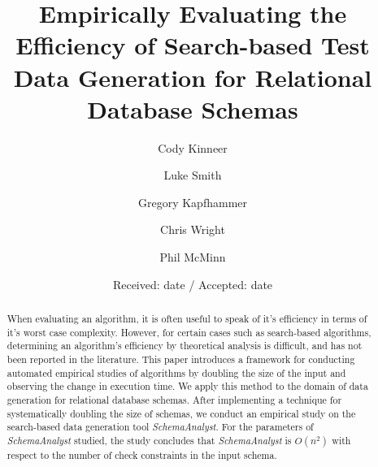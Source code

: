 \documentclass[smallextended]{svjour3}       %
\begin{document}
\title{Empirically Evaluating the Efficiency of Search-based Test Data
Generation for Relational Database Schemas}



\author{Cody Kinneer         \and
        Luke Smith \and
        Gregory Kapfhammer \and
        Chris Wright \and
        Phil McMinn
}



\date{Received: date / Accepted: date}


\maketitle

\begin{abstract}
When evaluating an algorithm, it is often useful to speak of it's
efficiency in terms of it's worst case complexity.  However, for certain
cases such as search-based algorithms, determining an algorithm's
efficiency by theoretical analysis is difficult, and has not been
reported in the literature. This paper introduces a
framework for conducting automated empirical studies of algorithms by
doubling the size of the input and observing the change in execution
time. We apply this method to the domain of data generation for
relational database schemas.  After implementing a technique for 
systematically doubling the size of schemas, we conduct an
empirical study on the search-based data generation tool
\textit{SchemaAnalyst}. For the parameters of \textit{SchemaAnalyst}
studied, the study concludes that \textit{SchemaAnalyst} is $O(n^2)$
with respect to the number of check constraints in the input schema.


\end{abstract}
\end{document}
